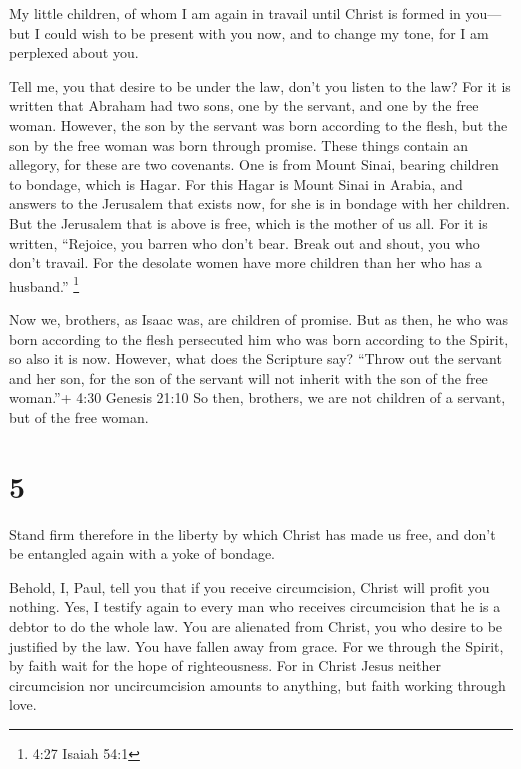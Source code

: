  My little children, of whom I am again in travail until
Christ is formed in you---  but I could wish to be present
with you now, and to change my tone, for I am perplexed about you.

 Tell me, you that desire to be under the law, don't you
listen to the law?  For it is written that Abraham had two
sons, one by the servant, and one by the free woman. 
However, the son by the servant was born according to the flesh, but the
son by the free woman was born through promise.  These
things contain an allegory, for these are two covenants. One is from
Mount Sinai, bearing children to bondage, which is Hagar. 
For this Hagar is Mount Sinai in Arabia, and answers to the Jerusalem
that exists now, for she is in bondage with her children. 
But the Jerusalem that is above is free, which is the mother of us all.
 For it is written, ``Rejoice, you barren who don't bear.
Break out and shout, you who don't travail. For the desolate women have
more children than her who has a husband.'' \footnote{4:27 Isaiah 54:1}

 Now we, brothers, as Isaac was, are children of promise.
 But as then, he who was born according to the flesh
persecuted him who was born according to the Spirit, so also it is now.
 However, what does the Scripture say? ``Throw out the
servant and her son, for the son of the servant will not inherit with
the son of the free woman.''+ 4:30 Genesis 21:10  So then,
brothers, we are not children of a servant, but of the free woman.

\hypertarget{section-4}{%
\section{5}\label{section-4}}

 Stand firm therefore in the liberty by which Christ has
made us free, and don't be entangled again with a yoke of bondage.

 Behold, I, Paul, tell you that if you receive circumcision,
Christ will profit you nothing.  Yes, I testify again to
every man who receives circumcision that he is a debtor to do the whole
law.  You are alienated from Christ, you who desire to be
justified by the law. You have fallen away from grace.  For
we through the Spirit, by faith wait for the hope of righteousness.
 For in Christ Jesus neither circumcision nor uncircumcision
amounts to anything, but faith working through love.

